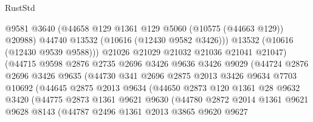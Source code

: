 \begin{lexlean}{RustStd}
\begin{coremodule}
                              @9581
                              @3640
                              (@44658 @129 @1361 @129 @5060 (@10575 (@44663 @129)) @20988)
                              @44740
                              @13532
                              (@10616 (@12430 @9582 @3426)))
                            @13532
                            (@10616 (@12430 @9539 @9588)))
                          @21026
                          @21029
                          @21032
                          @21036
                          @21041
                          @21047)
                        (@44715
                          @9598
                          @2876
                          @2735
                          @2696
                          @3426
                          @9636
                          @3426
                          @9029
                          (@44724
                            @2876
                            @2696
                            @3426
                            @9635
                            (@44730
                              @341
                              @2696
                              @2875
                              @2013
                              @3426
                              @9634
                              @7703
                              @10692
                              (@44645
                                @2875
                                @2013
                                @9634
                                (@44650
                                  @2873
                                  @120
                                  @1361
                                  @28
                                  @9632
                                  @3420
                                  (@44775
                                    @2873
                                    @1361
                                    @9621
                                    @9630
                                    (@44780
                                      @2872
                                      @2014
                                      @1361
                                      @9621
                                      @9628
                                      @8143
                                      (@44787
                                        @2496
                                        @1361
                                        @2013
                                        @3865
                                        @9620
                                        @9627

\end{coremodule}
\end{lexlean}
